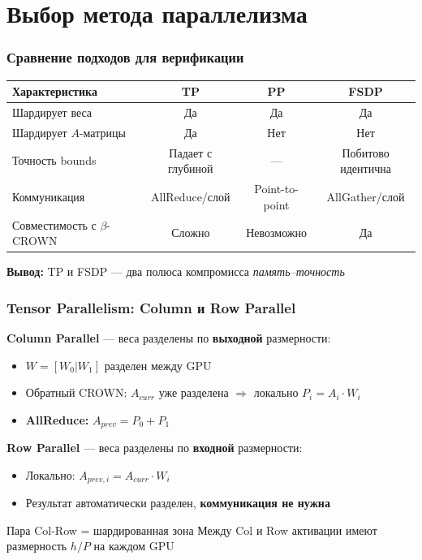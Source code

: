 
\section{Выбор метода параллелизма}

\begin{frame}
\frametitle{Сравнение подходов для верификации}

\begin{table}[h]
\centering
\scriptsize
\begin{tabular}{|l|c|c|c|}
\hline
\textbf{Характеристика} & \textbf{TP} & \textbf{PP} & \textbf{FSDP} \\
\hline
Шардирует веса & Да & Да & Да \\
\hline
Шардирует $A$-матрицы & Да & Нет & Нет \\
\hline
Точность bounds & Падает с глубиной & --- & Побитово идентична \\
\hline
Коммуникация & AllReduce/слой & Point-to-point & AllGather/слой \\
\hline
Совместимость с $\beta$-CROWN & Сложно & Невозможно & Да \\
\hline
\end{tabular}
\end{table}

\vspace{0.3cm}

\textbf{Вывод:} TP и FSDP --- два полюса компромисса \textit{память--точность}

\end{frame}

\begin{frame}
\frametitle{Tensor Parallelism: Column и Row Parallel}

\textbf{Column Parallel} --- веса разделены по \textbf{выходной} размерности:
\begin{itemize}
    \item $W = [W_0 | W_1]$ разделен между GPU
    \item Обратный CROWN: $A_{curr}$ уже разделена $\Rightarrow$ локально $P_i = A_i \cdot W_i$
    \item \textbf{AllReduce:} $A_{prev} = P_0 + P_1$
\end{itemize}

\vspace{0.3cm}

\textbf{Row Parallel} --- веса разделены по \textbf{входной} размерности:
\begin{itemize}
    \item Локально: $A_{prev,i} = A_{curr} \cdot W_i$
    \item Результат автоматически разделен, \textbf{коммуникация не нужна}
\end{itemize}

\vspace{0.3cm}

\begin{exampleblock}{Пара Col-Row = шардированная зона}
Между Col и Row активации имеют размерность $h/P$ на каждом GPU
\end{exampleblock}

\end{frame}

